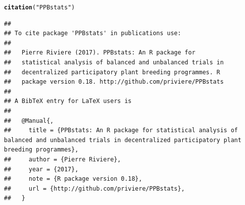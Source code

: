 \documentclass{book}\usepackage[]{graphicx}\usepackage[]{color}
\makeatletter
\newcommand{\hlstr}[1]{\textcolor[rgb]{0.192,0.494,0.8}{#1}}%
\newcommand{\hlstd}[1]{\textcolor[rgb]{0.345,0.345,0.345}{#1}}%
\newcommand{\hlkwd}[1]{\textcolor[rgb]{0.737,0.353,0.396}{\textbf{#1}}}%
\newenvironment{kframe}{%
 \def\at@end@of@kframe{}%
 \ifinner\ifhmode%
  \def\at@end@of@kframe{\end{minipage}}%
  \begin{minipage}{\columnwidth}%
 \fi\fi%
 \def\FrameCommand##1{\hskip\@totalleftmargin \hskip-\fboxsep
 \colorbox{shadecolor}{##1}\hskip-\fboxsep
     \hskip-\linewidth \hskip-\@totalleftmargin \hskip\columnwidth}%
 \MakeFramed {\advance\hsize-\width
   \@totalleftmargin\z@ \linewidth\hsize
   \@setminipage}}%
 {\par\unskip\endMakeFramed%
 \at@end@of@kframe}
\newenvironment{knitrout}{}{} %
\makeatother
\begin{document}
\begin{knitrout}
\color{fgcolor}\begin{kframe}
\begin{alltt}
\hlkwd{citation}\hlstd{(}\hlstr{"PPBstats"}\hlstd{)}
\end{alltt}
\begin{verbatim}
## 
## To cite package 'PPBstats' in publications use:
## 
##   Pierre Riviere (2017). PPBstats: An R package for
##   statistical analysis of balanced and unbalanced trials in
##   decentralized participatory plant breeding programmes. R
##   package version 0.18. http://github.com/priviere/PPBstats
## 
## A BibTeX entry for LaTeX users is
## 
##   @Manual{,
##     title = {PPBstats: An R package for statistical analysis of balanced and unbalanced trials in decentralized participatory plant breeding programmes},
##     author = {Pierre Riviere},
##     year = {2017},
##     note = {R package version 0.18},
##     url = {http://github.com/priviere/PPBstats},
##   }
\end{verbatim}
\end{kframe}
\end{knitrout}


\end{document}
